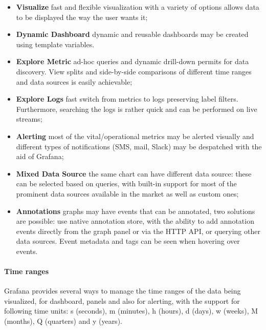 \begin{itemize}
    \item \textbf{Visualize} fast and flexible visualization with a variety of options allows data to be displayed the way the user wants it;
    \item \textbf{Dynamic Dashboard} dynamic and reusable dashboards may be created using template variables.
    \item \textbf{Explore Metric} ad-hoc queries and dynamic drill-down permits for data discovery.
          View splits and side-by-side comparisons of different time ranges and data sources is easily achievable;
    \item \textbf{Explore Logs} fast switch from metrics to logs preserving label filters. Furthermore, searching the logs is rather quick and can be performed on live streams;
    \item \textbf{Alerting} most of the vital/operational metrics may be alerted visually and different types of notifications (SMS, mail, Slack) may be despatched with the aid of Grafana;
    \item \textbf{Mixed Data Source} the same chart can have different data source: these can be selected based on queries, with built-in support for most of the prominent data sources available in the market as well as custom ones;
    \item \textbf{Annotations} graphs may have events that can be annotated, two solutions are possible:
          use native annotation store, with the ability to add annotation events directly from the graph panel or via the HTTP API, or querying other data sources.
          Event metadata and tags can be seen when hovering over events.
\end{itemize}
\paragraph{Time ranges}
Grafana provides several ways to manage the time ranges of the data being visualized, for dashboard, panels and also for alerting, 
with the support for following time units: s (seconds), m (minutes), h (hours), d (days), w (weeks), M (months), Q (quarters) and y (years).

